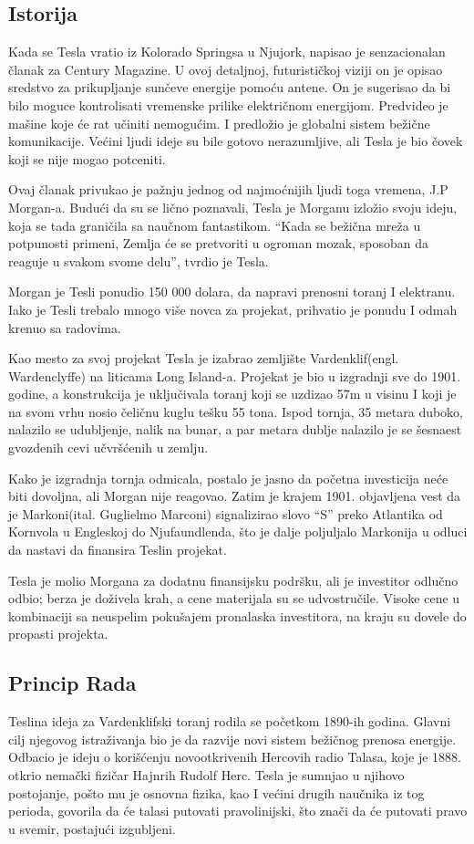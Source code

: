 \documentclass[a4paper]{article}
\begin{document}
\subsection{Istorija}
\label{subsec:istorija}
Kada se Tesla vratio iz Kolorado Springsa u Njujork, napisao je senzacionalan članak za Century Magazine\cite{teslinClanak}. U ovoj detaljnoj, futurističkoj viziji on je opisao sredstvo za prikupljanje sunčeve energije pomoću antene. On je sugerisao da bi bilo moguce kontrolisati vremenske prilike električnom energijom. Predvideo je mašine koje će rat učiniti nemogućim. I predložio je globalni sistem bežične komunikacije. Većini ljudi ideje su bile gotovo nerazumljive, ali Tesla je bio čovek koji se nije mogao potceniti.

Ovaj članak privukao je pažnju jednog od najmoćnijih ljudi toga vremena, J.P Morgan-a. Budući da su se lično poznavali, Tesla je Morganu izložio svoju ideju, koja se tada graničila sa naučnom fantastikom. “Kada se bežična mreža u potpunosti primeni, Zemlja će se pretvoriti u ogroman mozak, sposoban da reaguje u svakom svome delu”\cite{intervju1926}, tvrdio je Tesla.

Morgan je Tesli ponudio 150 000 dolara, da napravi prenosni toranj I elektranu. Iako je Tesli trebalo mnogo više novca za projekat, prihvatio je ponudu I odmah krenuo sa radovima.


Kao mesto za svoj projekat Tesla je izabrao zemljište Vardenklif(engl. Wardenclyffe) na liticama Long Island-a. Projekat je bio u izgradnji sve do 1901. godine, a konstrukcija je uključivala toranj koji se uzdizao 57m u visinu I koji je na svom vrhu nosio čeličnu kuglu tešku 55 tona. Ispod tornja, 35 metara duboko, nalazilo se udubljenje, nalik na bunar, a par metara dublje nalazilo je se šesnaest gvozdenih cevi učvršćenih u zemlju.

Kako je izgradnja tornja odmicala, postalo je jasno da početna investicija neće biti dovoljna, ali Morgan nije reagovao. Zatim je krajem 1901. objavljena vest da je Markoni(ital. Guglielmo Marconi) signalizirao slovo “S” preko Atlantika od Kornvola u Engleskoj do Njufaundlenda, što je dalje poljuljalo Markonija u odluci da nastavi da finansira Teslin projekat.

Tesla je molio Morgana za dodatnu finansijsku podršku, ali je investitor odlučno odbio; berza je doživela krah, a cene materijala su se udvostručile. Visoke cene u kombinaciji sa neuspelim pokušajem pronalaska investitora, na kraju su dovele do propasti projekta.

\subsection{Princip Rada}
\label{subsec:principrada}
Teslina ideja za Vardenklifski toranj rodila se početkom 1890-ih godina. Glavni cilj njegovog istraživanja bio je da razvije novi sistem bežičnog prenosa energije. Odbacio je ideju o korišćenju novootkrivenih Hercovih radio Talasa, koje je 1888. otkrio nemački fizičar Hajnrih Rudolf Herc. Tesla je sumnjao u njihovo postojanje, pošto mu je osnovna fizika, kao I većini drugih naučnika iz tog perioda, govorila da će talasi  putovati pravolinijski, što znači da će putovati pravo u svemir, postajući izgubljeni.\cite{izgubljeniTalasi}
\end{document}
